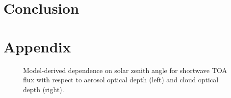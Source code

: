 \documentclass[12pt]{article}
\begin{document}

    \clearpage

    \section{Conclusion}

    \clearpage

    \section{Appendix}

    \begin{figure}[h!]
        \centering
        \begin{center}
        \end{center}
        \caption{Model-derived dependence on solar zenith angle for shortwave TOA flux with respect to aerosol optical depth (left) and cloud optical depth (right).}
        \label{szadep}
    \end{figure}


    
\end{document}
